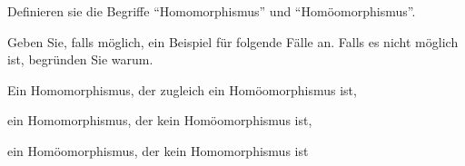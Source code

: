 \begin{aufgabe}[Begriffe]\label{ub3:meinsExtra}
    Definieren sie die Begriffe \enquote{Homomorphismus} und
    \enquote{Homöomorphismus}.

    Geben Sie, falls möglich, ein Beispiel für folgende Fälle an.
    Falls es nicht möglich ist, begründen Sie warum.
    \begin{bspenum}
        \item Ein Homomorphismus, der zugleich ein Homöomorphismus ist,
        \item ein Homomorphismus, der kein Homöomorphismus ist,
        \item ein Homöomorphismus, der kein Homomorphismus ist
    \end{bspenum}
\end{aufgabe}
